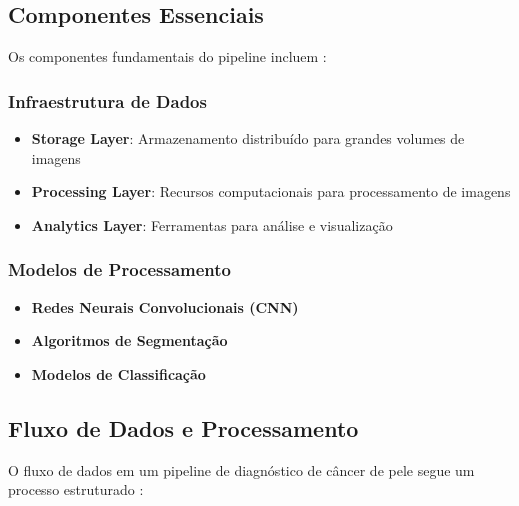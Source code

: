 \subsection{Componentes Essenciais}

Os componentes fundamentais do pipeline incluem \cite{kumar2023medical}:

\subsubsection{Infraestrutura de Dados}
\begin{itemize}
\item \textbf{Storage Layer}: Armazenamento distribuído para grandes volumes de imagens
\item \textbf{Processing Layer}: Recursos computacionais para processamento de imagens
\item \textbf{Analytics Layer}: Ferramentas para análise e visualização
\end{itemize}

\subsubsection{Modelos de Processamento}
\begin{itemize}
\item \textbf{Redes Neurais Convolucionais (CNN)}
\item \textbf{Algoritmos de Segmentação}
\item \textbf{Modelos de Classificação}
\end{itemize}

\subsection{Fluxo de Dados e Processamento}

O fluxo de dados em um pipeline de diagnóstico de câncer de pele segue um processo estruturado \cite{wang2023automated}:

